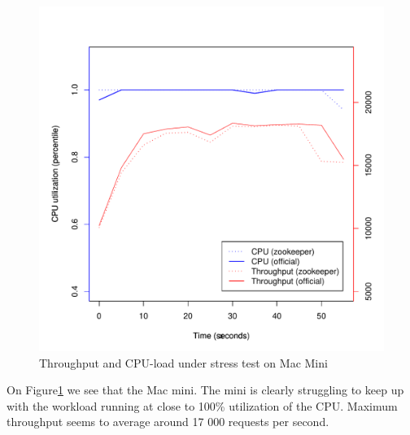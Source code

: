 \begin{figure}[h]
    \centering
    \includegraphics[width=1.0\textwidth]{results/throughput/singlenode/throughput_macmini}
    \caption{Throughput and CPU-load under stress test on Mac Mini}
    \label{fig:thug_mini}
\end{figure}

On Figure\ref{fig:thug_mini} we see that the Mac mini. The mini is clearly struggling to keep up with the workload running at close to 100\% utilization of the CPU. Maximum throughput seems to average around 17 000 requests per second.  

\clearpage

